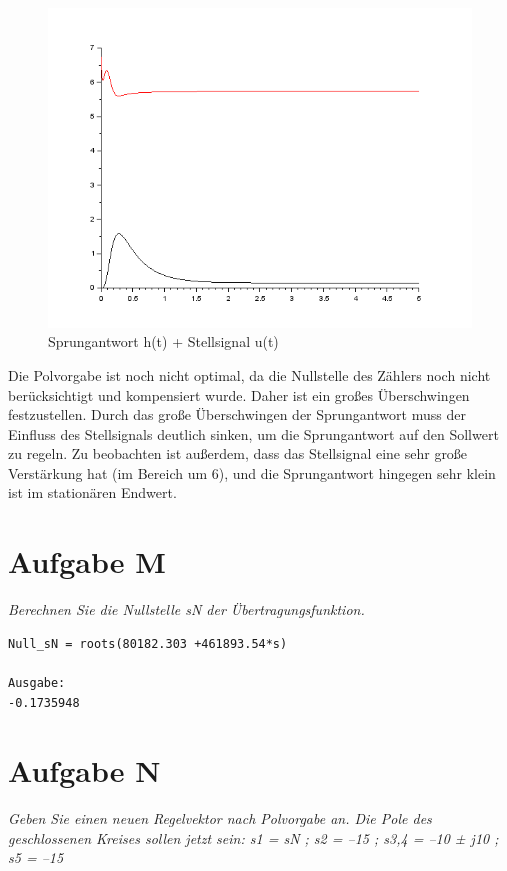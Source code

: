     \begin{figure}[!ht]
        \centering
        \includegraphics[width=0.8\linewidth]{images/AufgabeLPlot.png}
        \captionsetup{width=1.0\linewidth}
        \caption[Sprungantwort h(t) + Stellsignal u(t)]{Sprungantwort h(t) + Stellsignal u(t)}
        \label{fig:thkoeln} %
    \end{figure}


\noindent Die Polvorgabe ist noch nicht optimal, da die Nullstelle des Zählers noch nicht berücksichtigt und kompensiert wurde. Daher ist ein großes Überschwingen festzustellen. Durch das große Überschwingen der Sprungantwort muss der Einfluss des Stellsignals deutlich sinken, um die Sprungantwort auf den Sollwert zu regeln. Zu beobachten ist außerdem, dass das Stellsignal eine sehr große Verstärkung hat (im Bereich um 6), und die Sprungantwort hingegen sehr klein ist im stationären Endwert.
    




\section{Aufgabe M}
\textit{Berechnen Sie die Nullstelle sN der Übertragungsfunktion.}
 
\begin{lstlisting}[caption = Nullstelle sN der Übertragungsfunktion, captionpos = b, label = lst:example]
Null_sN = roots(80182.303 +461893.54*s)
    
Ausgabe:
-0.1735948
\end{lstlisting}
\noindent 






\section{Aufgabe N}
\textit{Geben Sie einen neuen Regelvektor nach Polvorgabe an. Die Pole des geschlossenen Kreises sollen jetzt sein: s1 = sN ; s2 = –15 ; s3,4 = –10 ± j10 ; s5 = –15}
 
